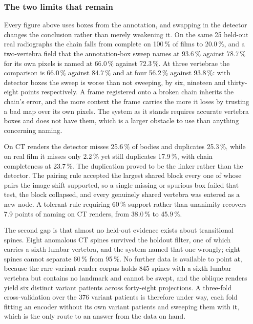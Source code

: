 \documentclass[11pt,letterpaper]{article}
\begin{document}
\subsubsection*{The two limits that remain}
Every figure above uses boxes from the annotation, and swapping in the detector changes the conclusion rather than merely weakening it. On the same 25 held-out real radiographs the chain falls from complete on 100\,\% of films to 20.0\,\%, and a two-vertebra field that the annotation-box sweep names at 93.6\,\% against 78.7\,\% for its own pixels is named at 66.0\,\% against 72.3\,\%. At three vertebrae the comparison is 66.0\,\% against 84.7\,\% and at four 56.2\,\% against 93.8\,\%: with detector boxes the sweep is worse than not sweeping, by six, nineteen and thirty-eight points respectively. A frame registered onto a broken chain inherits the chain's error, and the more context the frame carries the more it loses by trusting a bad map over its own pixels. The system as it stands requires accurate vertebra boxes and does not have them, which is a larger obstacle to use than anything concerning naming.

On CT renders the detector misses 25.6\,\% of bodies and duplicates 25.3\,\%, while on real film it misses only 2.2\,\% yet still duplicates 17.9\,\%, with chain completeness at 23.7\,\%. The duplication proved to be the linker rather than the detector. The pairing rule accepted the largest shared block every one of whose pairs the image shift supported, so a single missing or spurious box failed that test, the block collapsed, and every genuinely shared vertebra was entered as a new node. A tolerant rule requiring 60\,\% support rather than unanimity recovers 7.9 points of naming on CT renders, from 38.0\,\% to 45.9\,\%.

The second gap is that almost no held-out evidence exists about transitional spines. Eight anomalous CT spines survived the holdout filter, one of which carries a sixth lumbar vertebra, and the system named that one wrongly; eight spines cannot separate 60\,\% from 95\,\%. No further data is available to point at, because the rare-variant render corpus holds 845 spines with a sixth lumbar vertebra but contains no landmark and cannot be swept, and the oblique renders yield six distinct variant patients across forty-eight projections. A three-fold cross-validation over the 376 variant patients is therefore under way, each fold fitting an encoder without its own variant patients and sweeping them with it, which is the only route to an answer from the data on hand.
\end{document}

